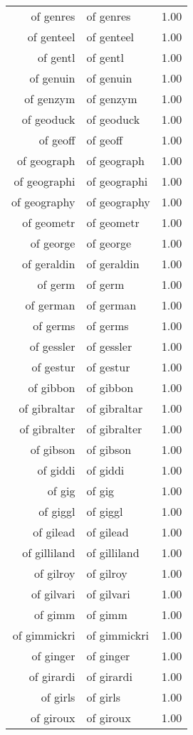 \begin{table}[ht]
\begin{tabular}{rlr}
  of genres & of genres & 1.00 \\ 
  of genteel & of genteel & 1.00 \\ 
  of gentl & of gentl & 1.00 \\ 
  of genuin & of genuin & 1.00 \\ 
  of genzym & of genzym & 1.00 \\ 
  of geoduck & of geoduck & 1.00 \\ 
  of geoff & of geoff & 1.00 \\ 
  of geograph & of geograph & 1.00 \\ 
  of geographi & of geographi & 1.00 \\ 
  of geography & of geography & 1.00 \\ 
  of geometr & of geometr & 1.00 \\ 
  of george & of george & 1.00 \\ 
  of geraldin & of geraldin & 1.00 \\ 
  of germ & of germ & 1.00 \\ 
  of german & of german & 1.00 \\ 
  of germs & of germs & 1.00 \\ 
  of gessler & of gessler & 1.00 \\ 
  of gestur & of gestur & 1.00 \\ 
  of gibbon & of gibbon & 1.00 \\ 
  of gibraltar & of gibraltar & 1.00 \\ 
  of gibralter & of gibralter & 1.00 \\ 
  of gibson & of gibson & 1.00 \\ 
  of giddi & of giddi & 1.00 \\ 
  of gig & of gig & 1.00 \\ 
  of giggl & of giggl & 1.00 \\ 
  of gilead & of gilead & 1.00 \\ 
  of gilliland & of gilliland & 1.00 \\ 
  of gilroy & of gilroy & 1.00 \\ 
  of gilvari & of gilvari & 1.00 \\ 
  of gimm & of gimm & 1.00 \\ 
  of gimmickri & of gimmickri & 1.00 \\ 
  of ginger & of ginger & 1.00 \\ 
  of girardi & of girardi & 1.00 \\ 
  of girls & of girls & 1.00 \\ 
  of giroux & of giroux & 1.00 \\ 

\end{tabular}
\end{table}
